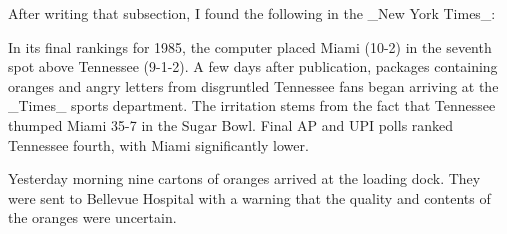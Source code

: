 After writing that subsection, I found the following in the _New York Times_:

In its final rankings for 1985, the computer placed Miami (10-2) in the seventh spot above Tennessee (9-1-2). A few days after publication, packages containing oranges and angry letters from disgruntled Tennessee fans began arriving at the _Times_ sports department. The irritation stems from the fact that Tennessee thumped Miami 35-7 in the Sugar Bowl. Final AP and UPI polls ranked Tennessee fourth, with Miami significantly lower.

Yesterday morning nine cartons of oranges arrived at the loading dock. They were sent to Bellevue Hospital with a warning that the quality and contents of the oranges were uncertain.

 